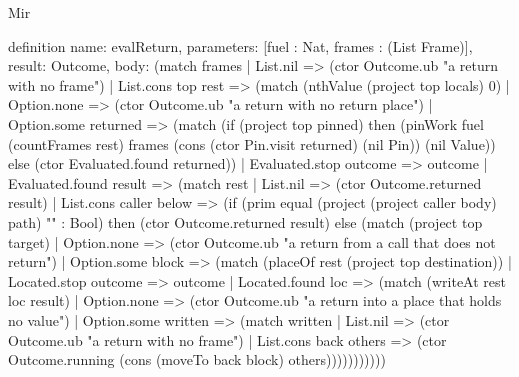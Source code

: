 \begin{lexlean}{Mir}
\begin{semanticmodule}
definition{
  name: evalReturn,
  parameters: [fuel : Nat, frames : (List Frame)],
  result: Outcome,
  body: (match frames
    | List.nil => (ctor Outcome.ub "a return with no frame")
    | List.cons top rest => (match (nthValue (project top locals) 0)
      | Option.none => (ctor Outcome.ub "a return with no return place")
      | Option.some returned => (match (if (project top pinned) then (pinWork fuel (countFrames rest) frames (cons (ctor Pin.visit returned) (nil Pin)) (nil Value)) else (ctor Evaluated.found returned))
        | Evaluated.stop outcome => outcome
        | Evaluated.found result => (match rest
          | List.nil => (ctor Outcome.returned result)
          | List.cons caller below => (if (prim equal (project (project caller body) path) "" : Bool) then (ctor Outcome.returned result) else (match (project top target)
            | Option.none => (ctor Outcome.ub "a return from a call that does not return")
            | Option.some block => (match (placeOf rest (project top destination))
              | Located.stop outcome => outcome
              | Located.found loc => (match (writeAt rest loc result)
                | Option.none => (ctor Outcome.ub "a return into a place that holds no value")
                | Option.some written => (match written
                  | List.nil => (ctor Outcome.ub "a return with no frame")
                  | List.cons back others => (ctor Outcome.running (cons (moveTo back block) others)))))))))))
}


\end{semanticmodule}
\end{lexlean}
